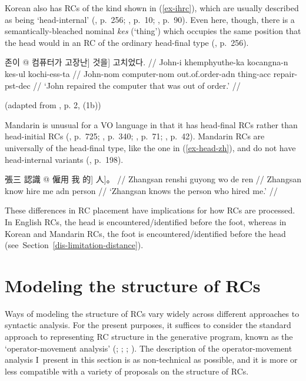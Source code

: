 \noindent Korean also has RCs of the kind shown in (\ref{ex-ihrc}), which are usually described as being `head-internal' (\cite{jeon.kim2007}, p.~256; \cite{jhang1994}, p.~10; \cite{song2021}, p.~90). Even here, though, there is a semantically-bleached nominal \textit{kes} (`thing') which occupies the same position that the head would in an RC of the ordinary head-final type (\cite{jeon.kim2007}, p.~256).

\ex[everygla=\ko]
\begingl
\gla 존이 \nogloss{\ko [[} @ 컴퓨터가 고장난{]}  것을{]} 고치었다. //
\glb John-i khemphyuthe-ka kocangna-n kes-ul kochi-ess-ta //
\glc John-{\sc nom} computer-{\sc nom} out.of.order-{\sc adn} thing-{\sc acc} repair-{\sc pst-dec} //
\glft `John repaired the computer that was out of order.' //
\endgl
\par\nobreak\vspace{5pt}
\hfill (adapted from \cite{jhang1994}, p. 2, (1b)) \label{ex-ihrc}
\xe

Mandarin is unusual for a VO language in that it has head-final RCs rather than head-initial RCs (\cite{comrie2008}, p.~725; \cite{dryer2011}, p.~340; \cite{greenberg1963}, p.~71; \cite{ogrady2022a}, p.~42). Mandarin RCs are universally of the head-final type, like the one in (\ref{ex-head-zh}), and do not have head-internal variants (\cite{chan.etal2011}, p.~198).

\ex[everygla=\zh]
\begingl
\gla 張三 認識 \nogloss{[[\ko \_\_ } @ 僱用 我 的{\ko ]} 人{\ko ]}。 //
\glb Zhangsan renshi guyong wo de ren //
\glc Zhangsan know  hire me {\sc adn} person //
\glft `Zhangsan knows the person who hired me.' //
\endgl \label{ex-head-zh}
\xe

These differences in RC placement have implications for how RCs are processed. In English RCs, the head is encountered/identified before the foot, whereas in Korean and Mandarin RCs, the foot is encountered/identified before the head (see~Section~\ref{dis-limitation-distance}).

\section{Modeling the structure of RCs}\label{pro-structure}

Ways of modeling the structure of RCs vary widely across different approaches to syntactic analysis. For the present purposes, it suffices to consider the standard approach to representing RC structure in the generative program, known as the `operator-movement analysis' (\cite{chomsky1977}; \cite{haegeman1994}; \cite{jackendoff1977}; \cite{safir1982}). The description of the operator-movement analysis I~present in this section is as non-technical as possible, and it is more or less compatible with a variety of proposals on the structure of RCs.

